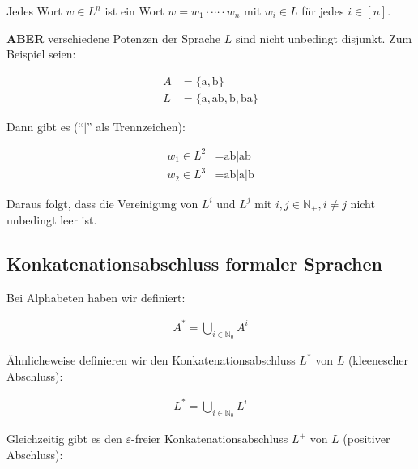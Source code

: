 \documentclass[12pt,a4paper,oneside]{article}
\newcommand{\afz}[1]{\enquote{#1}}
\newcommand{\emptyline}{\hspace*{\fill}}
\newcommand{\N}{\mathbb{N}}
\begin{document}
            \newpage

            Jedes Wort $w \in L^n$ ist ein Wort $w = w_1 \cdot \cdots \cdot w_n$ mit $w_i \in L$ für jedes $i \in [n]$.

            \emptyline

            \textbf{ABER} verschiedene Potenzen der Sprache $L$ sind nicht unbedingt disjunkt.
            Zum Beispiel seien:

            \vspace{-1em}
            \begin{align*}
                A &= \{\text{a}, \text{b}\} \\
                L &= \{\text{a}, \text{ab}, \text{b}, \text{ba}\}
            \end{align*}

            Dann gibt es (\afz{$|$} als Trennzeichen):

            \vspace{-1em}
            \begin{align*}
                w_1 \in L^2 &= \text{ab|ab} \\
                w_2 \in L^3 &= \text{ab|a|b}
            \end{align*}

            Daraus folgt, dass die Vereinigung von $L^i$ und $L^j$ mit $i, j \in \N_+, i \neq j$ nicht unbedingt leer ist.

        \subsection{Konkatenationsabschluss formaler Sprachen}

            Bei Alphabeten haben wir definiert:

            \vspace{-1em}
            \begin{align*}
                A^* = \bigcup_{i \in \N_0} A^i
            \end{align*}

            Ähnlicheweise definieren wir den Konkatenationsabschluss $L^*$ von $L$ (kleenescher Abschluss):

            \vspace{-1em}
            \begin{align*}
                L^* = \bigcup_{i \in \N_0} L^i
            \end{align*}

            Gleichzeitig gibt es den $\varepsilon$-freier Konkatenationsabschluss $L^+$ von $L$ (positiver Abschluss):
\end{document}
